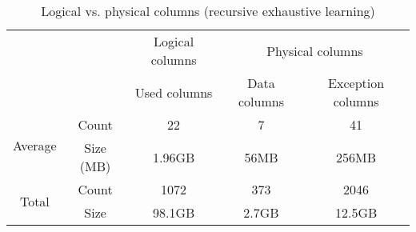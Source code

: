\begin{table}[h]
\centering
\begin{tabular}{cc|c|cc}
                         &           & Logical columns & \multicolumn{2}{c}{Physical columns} \\
                         &           & Used columns    & Data columns   & Exception columns   \\ \hline
\multirow{2}{*}{Average} & Count     & 22              & 7              & 41                  \\
                         & Size (MB) & 1.96GB          & 56MB           & 256MB               \\ \hline
\multirow{2}{*}{Total}   & Count     & 1072            & 373            & 2046                \\
                         & Size      & 98.1GB          & 2.7GB          & 12.5GB             
\end{tabular}
\caption{Logical vs. physical columns (recursive exhaustive learning)}
\label{tab:eval:results:recexh:analysis1}
\end{table}